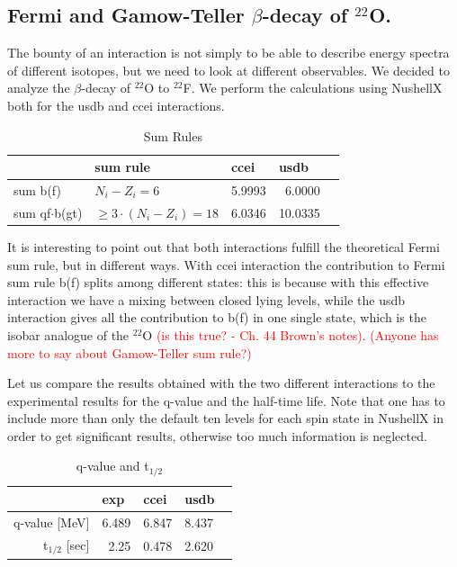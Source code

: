 \documentclass{llncs}
\begin{document}
\subsection{Fermi and Gamow-Teller $\beta$-decay of $^{22}$O.}
%
The bounty of an interaction is not simply to be able to describe energy spectra of different isotopes, but we need to look at different observables. We decided to analyze the $\beta$-decay of $^{22}$O to $^{22}$F.
We perform the calculations using NushellX both for the usdb and ccei interactions. 
\begin{table}[h!]
\caption{Sum Rules}
\begin{center}
\begin{tabular}{l@{\qquad}l@{\qquad}r@{\qquad}rl}
\hline
\multicolumn{1}{l}{\rule{0pt}{12pt}
                   }&\multicolumn{1}{l}{\rule{0pt}{12pt} sum rule}&\multicolumn{1}{l}{ccei}&\multicolumn{2}{l}{usdb}\\[2pt]
\hline\rule{0pt}{12pt}
sum b(f)            &  $N_i-Z_i=6$   & 5.9993 & 6.0000 &\\
sum qf$\cdot$b(gt)  &  $\ge 3\cdot(N_i-Z_i)=18$  & 6.0346 & 10.0335 &\\[2pt]
\hline
\end{tabular}
\end{center}
\end{table}

It is interesting to point out that both interactions fulfill the theoretical Fermi sum rule, but in different ways.
With ccei interaction the contribution to Fermi sum rule b(f) splits among different states: this is because with this effective interaction we have a mixing between closed lying levels, while the usdb interaction gives all the contribution to b(f) in one single state, which is the isobar analogue of the $^{22}$O \textcolor{red}{(is this true? - Ch. 44 Brown's notes)}. 
\textcolor{red}{(Anyone has more to say about Gamow-Teller sum rule?)}

Let us compare the results obtained with the two different interactions to the experimental results for the q-value and the half-time life. Note that one has to include more than only the default ten levels for each spin state in NushellX in order to get significant results, otherwise too much information is neglected.
\begin{table}[h!]
\caption{q-value and t$_{1/2}$}
\begin{center}
\begin{tabular}{r@{\qquad}r@{\qquad}r@{\qquad}r@{\qquad}l}
\hline
\multicolumn{1}{l}{\rule{0pt}{12pt}
                   }&\multicolumn{1}{l}{exp}&\multicolumn{1}{l}{ccei}&\multicolumn{2}{l}{usdb}\\[2pt]
\hline\rule{0pt}{12pt}
q-value [MeV]   &     6.489 & 6.847 & 8.437 &\\
t$_{1/2}$ [sec] &     2.25  & 0.478 & 2.620 &\\[2pt]
\hline
\end{tabular}
\end{center}
\end{table}
\end{document}
